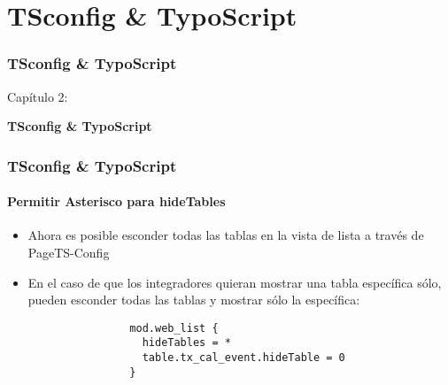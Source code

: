 %

\section{TSconfig \& TypoScript}
\begin{frame}[fragile]
	\frametitle{TSconfig \& TypoScript}

	\begin{center}\huge{Capítulo 2:}\end{center}
	\begin{center}\huge{\color{typo3darkgrey}\textbf{TSconfig \& TypoScript}}\end{center}

\end{frame}

\begin{frame}[fragile]
	\frametitle{TSconfig \& TypoScript}
	\framesubtitle{Permitir Asterisco para hideTables}

	\lstset{basicstyle=\tiny\ttfamily}

	\begin{itemize}
		\item Ahora es posible esconder todas las tablas en la vista de lista a través de
			PageTS-Config

		\item En el caso de que los integradores quieran mostrar una tabla específica sólo, pueden
			esconder todas las tablas y mostrar sólo la específica:

			\begin{lstlisting}
				mod.web_list {
				  hideTables = *
				  table.tx_cal_event.hideTable = 0
				}
			\end{lstlisting}

	\end{itemize}

\end{frame}

